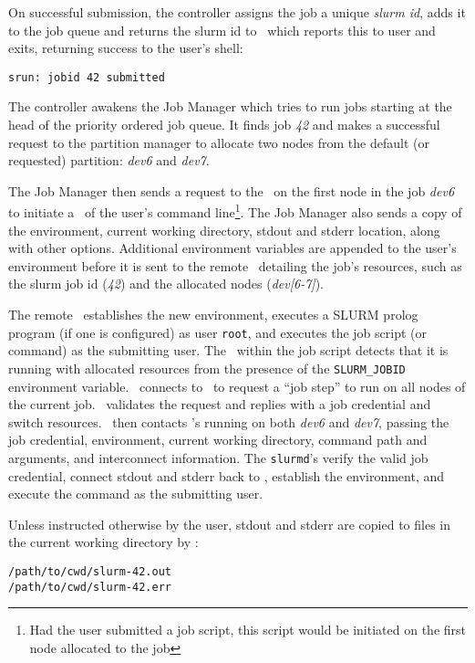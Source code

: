 On successful submission, the controller assigns the job a unique 
{\em slurm id}, adds it to the job queue and returns the 
slurm id to \srun\, which reports this to user and exits, returning
success to the user's shell:

\begin{verbatim}
srun: jobid 42 submitted
\end{verbatim}

The controller awakens the Job Manager which tries to run
jobs starting at the head of the priority ordered job queue.  It finds job {\em 42}
and makes a successful request to the partition manager to allocate 
two nodes from the default (or requested) partition: {\em dev6} and 
{\em dev7}.

The Job Manager then sends a request to the \slurmd\ on the first node 
in the job {\em dev6} to initiate a \srun\ of the user's
command line\footnote{Had the user submitted a job script, this script would
be initiated on the first node allocated to the job}. The Job Manager also sends a 
copy of the environment, current working directory, stdout and stderr location,
along with other options. Additional environment variables are appended
to the user's environment before it is sent to the remote \slurmd\ detailing
the job's resources, such as the slurm job id ({\em 42}) and the
allocated nodes ({\em dev[6-7]}).

The remote \slurmd\ establishes the new environment, executes a SLURM 
prolog program (if one is configured) as user {\tt root}, and executes the
job script (or command) as the submitting user. The \srun\ within the job script 
detects that it is running with allocated resources from the presence
of the {\tt SLURM\_JOBID} environment variable. \srun\ connects to
\slurmctld\ to request a ``job step'' to run on all nodes of the current
job. \slurmctld\ validates the request and replies with a job credential
and switch resources. \srun\ then contacts \slurmd 's running on both
{\em dev6} and {\em dev7}, passing the job credential, environment,
current working directory, command path and arguments, and interconnect
information. The {\tt slurmd}'s verify the valid job credential, connect
stdout and stderr back to \srun , establish the environment, and execute
the command as the submitting user.

Unless instructed otherwise by the user, stdout and stderr are
copied to files in the current working directory by \srun :

\begin{verbatim}
/path/to/cwd/slurm-42.out
/path/to/cwd/slurm-42.err
\end{verbatim}

